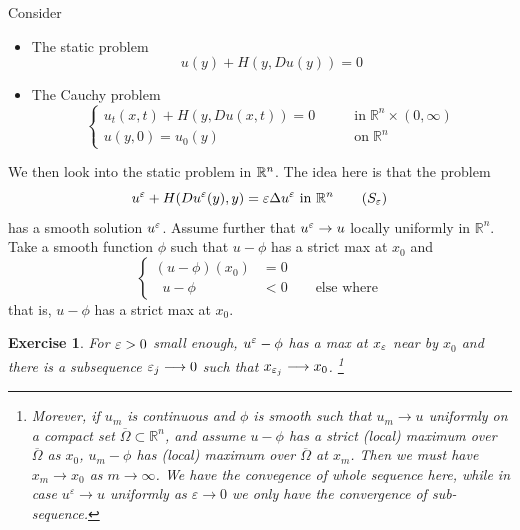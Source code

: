 \documentclass[12pt, oneside]{amsart}  	%
\newtheorem{exercise}{Exercise}
\begin{document}
Consider
\begin{itemize}
\item The static problem 
\begin{equation}\label{S}
	u(y)+H(y,Du(y))=0 \tag{S}
\end{equation}
\item The Cauchy problem 
\begin{equation}\label{C}
\begin{cases}
u_t(x,t) + H(y,Du(x,t)) = 0 &\qquad\text{in}\;\mathbb{R}^n\times (0,\infty)\\
u(y,0)  = u_0(y) &\qquad\text{on}\;\mathbb{R}^n
\end{cases} \tag{$C$}
\end{equation}
\end{itemize}



We then look into the static problem in $\mathbb{R}^n$. The idea here is that the problem
\begin{equation}\label{S_varepsilon}
	u^\varepsilon + H(Du^\varepsilon(y), y)=\varepsilon\Delta u^\varepsilon \text{ in } \mathbb{R}^n \tag{$S_\varepsilon$}
\end{equation}
has a smooth solution $u^\varepsilon$. Assume further that $u^\varepsilon \to u$ locally uniformly in $\mathbb{R}^n$. %
Take a smooth function $\phi$ such that $u-\phi$ has a strict max at $x_0$ and %
\begin{equation*}
	\begin{cases}
		(u-\phi)(x_0)&=0\\
	\;\;	u - \phi &< 0 \qquad\text{else where}
	\end{cases}
\end{equation*}
that is, $u-\phi$ has a strict max at $x_0$.
\begin{exercise}\label{exercise1}
For $\varepsilon>0$ small enough, $u^\varepsilon -\phi$ has a max at $x_\varepsilon$ near by $x_0$ and there is a subsequence $\varepsilon_j\longrightarrow 0$ such that $x_{\varepsilon_j}\longrightarrow x_0$. \footnote{Morever, if  $u_m$ is continuous and $\phi$ is smooth such that $u_m \longrightarrow u$ uniformly on a compact set $\overline{\Omega}\subset\mathbb{R}^n$, and assume $u - \phi$ has a strict (local) maximum over $\overline{\Omega}$ as $x_0$, $u_m - \phi$ has (local) maximum over $\overline{\Omega}$ at $x_m$. Then we must have $x_m\longrightarrow  x_0$ as $m\longrightarrow\infty$. We have the convegence of whole sequence here, while in case $u^{\varepsilon}\longrightarrow u$ uniformly as $\varepsilon\longrightarrow 0$ we only have the convergence of sub-sequence.}
\end{exercise}
\end{document}
